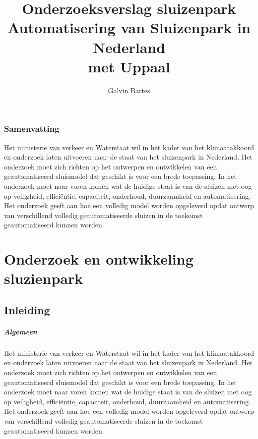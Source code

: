 \documentclass[11pt]{report} %
\title{Onderzoeksverslag sluizenpark \\
\large Automatisering van Sluizenpark in Nederland\\
    met Uppaal}
\author{Galvin Bartes}
\begin{document}
	
	
\maketitle

\section{Samenvatting}
Het ministerie van verkeer en Waterstaat wil in het kader van het klimaatakkoord en onderzoek laten uitvoeren naar de staat van het sluizenpark in Nederland. Het onderzoek moet zich richten op het ontwerpen en ontwikkelen van een geautomatiseerd sluismodel dat geschikt is voor een brede toepassing. In het onderzoek moet naar voren komen wat de huidige staat is van de sluizen met oog op veiligheid, efficiëntie, capaciteit, onderhoud, duurzaamheid en automatisering. Het onderzoek geeft aan hoe een volledig model worden opgeleverd opdat ontwerp van verschillend volledig geautomatiseerde sluizen in de toekomst geautomatiseerd kunnen worden.  

\part{Onderzoek en ontwikkeling sluzienpark}

\chapter{Inleiding}

\subsubsection{Algemeen}

Het ministerie van verkeer en Waterstaat wil in het kader van het klimaatakkoord en onderzoek laten uitvoeren naar de staat van het sluizenpark in Nederland. Het onderzoek moet zich richten op het ontwerpen en ontwikkelen van een geautomatiseerd sluismodel dat geschikt is voor een brede toepassing. In het onderzoek moet naar voren komen wat de huidige staat is van de sluizen met oog op veiligheid, efficiëntie, capaciteit, onderhoud, duurzaamheid en automatisering. Het onderzoek geeft aan hoe een volledig model worden opgeleverd opdat ontwerp van verschillend volledig geautomatiseerde sluizen in de toekomst geautomatiseerd kunnen worden.  
\end{document}
